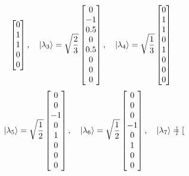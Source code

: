 \begin{example}
\begin{equation}
\begin{bmatrix}
			0 \\
			1 \\
			1 \\
			0 \\
			0 \\
		\end{bmatrix}, \quad \ket{\lambda_3}=\sqrt{\frac{2}{3}}
		\begin{bmatrix}
			0 \\
			-1 \\
			0.5 \\
			0 \\
			0.5 \\
			0 \\
			0 \\
			0 \\
		\end{bmatrix}, \quad \ket{\lambda_4}=\sqrt{\frac{1}{3}}
		\begin{bmatrix}
			0 \\
			1 \\
			1 \\
			0 \\
			1 \\
			0 \\
			0 \\
			0 \\
		\end{bmatrix}	
	\end{equation}
	\begin{equation}
		\ket{\lambda_5}=\sqrt{\frac{1}{2}}
		\begin{bmatrix}
			0 \\
			0 \\
			-1 \\
			0 \\
			1 \\
			0 \\
			0 \\
			0 \\
		\end{bmatrix}, \quad \ket{\lambda_6}=\sqrt{\frac{1}{2}}
		\begin{bmatrix}
			0 \\
			0 \\
			0 \\
			-1 \\
			0 \\
			1 \\
			0 \\
			0 \\
		\end{bmatrix}, \quad \ket{\lambda_7}=
		\begin{bmatrix}

\end{bmatrix}
\end{equation}
\end{example}
